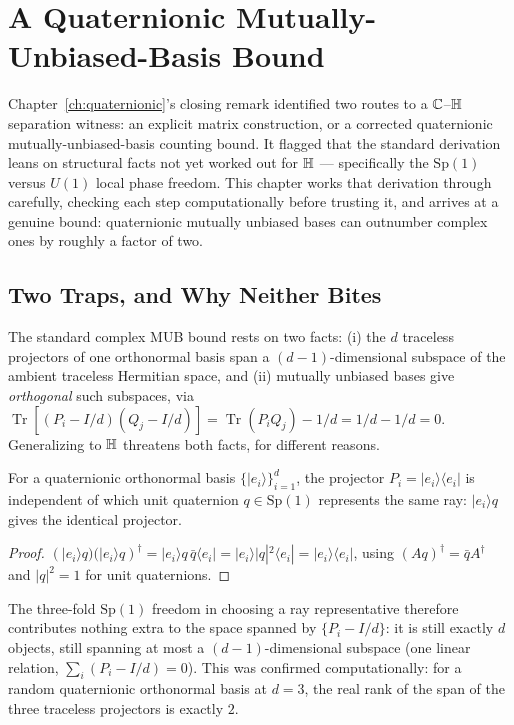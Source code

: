 \chapter{A Quaternionic Mutually-Unbiased-Basis Bound}
\label{ch:quaternionic-mub}

Chapter~\ref{ch:quaternionic}'s closing remark identified two routes to a
$\mathbb{C}$--$\mathbb{H}$ separation witness: an explicit matrix construction, or a
corrected quaternionic mutually-unbiased-basis counting bound. It flagged
that the standard derivation leans on structural facts not yet worked out
for $\mathbb{H}$ — specifically the $\mathrm{Sp}(1)$ versus $U(1)$ local phase
freedom. This chapter works that derivation through carefully, checking
each step computationally before trusting it, and arrives at a genuine
bound: quaternionic mutually unbiased bases can outnumber complex ones by
roughly a factor of two.

\section{Two Traps, and Why Neither Bites}

The standard complex MUB bound rests on two facts: (i) the $d$ traceless
projectors of one orthonormal basis span a $(d-1)$-dimensional subspace of
the ambient traceless Hermitian space, and (ii) mutually unbiased bases
give \emph{orthogonal} such subspaces, via
$\operatorname{Tr}[(P_i-I/d)(Q_j-I/d)] = \operatorname{Tr}(P_iQ_j) - 1/d =
1/d - 1/d = 0$. Generalizing to $\mathbb{H}$ threatens both facts, for
different reasons.

\begin{proposition}
\label{prop:h-di-1}
For a quaternionic orthonormal basis $\{|e_i\rangle\}_{i=1}^d$, the
projector $P_i = |e_i\rangle\langle e_i|$ is independent of which unit
quaternion $q\in\mathrm{Sp}(1)$ represents the same ray: $|e_i\rangle q$
gives the identical projector.
\end{proposition}

\begin{proof}
$(|e_i\rangle q)(|e_i\rangle q)^\dagger = |e_i\rangle q\,\bar q\langle e_i|
= |e_i\rangle |q|^2 \langle e_i| = |e_i\rangle\langle e_i|$, using
$(Aq)^\dagger = \bar q A^\dagger$ and $|q|^2=1$ for unit quaternions.
\end{proof}

The three-fold $\mathrm{Sp}(1)$ freedom in choosing a ray representative
therefore contributes nothing extra to the space spanned by
$\{P_i-I/d\}$: it is still exactly $d$ objects, still spanning at most a
$(d-1)$-dimensional subspace (one linear relation, $\sum_i(P_i-I/d)=0$).
This was confirmed computationally: for a random quaternionic orthonormal
basis at $d=3$, the real rank of the span of the three traceless
projectors is exactly $2$.

